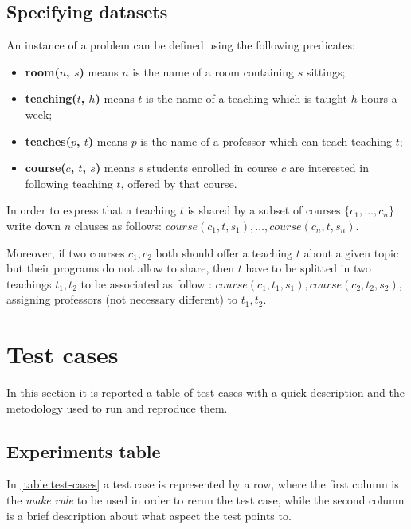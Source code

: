 \documentclass[10pt,a4paper]{article} %
\begin{document}
    \subsection{Specifying datasets}
    An instance of a problem can be defined using the following predicates:
    \begin{itemize}
        \item \textbf{room($n$, $s$)} means $n$ is the name
            of a room containing $s$ sittings;
        \item \textbf{teaching($t$, $h$)} means $t$ is the name
            of a teaching which is taught $h$ hours a week;
        \item \textbf{teaches($p$, $t$)} means $p$ is the name
            of a professor which can teach teaching $t$;
        \item \textbf{course($c$, $t$, $s$)} means $s$ students
            enrolled in course $c$ are interested in following
            teaching $t$, offered by that course.
    \end{itemize}
    In order to express that a teaching $t$ is shared by a subset of
    courses $\lbrace c_1, \ldots, c_n \rbrace$ write down $n$ clauses
    as follows: $ course(c_1, t, s_1), \ldots, course(c_n, t, s_n)$.

    Moreover, if two courses $c_1, c_2$ both should offer a teaching $t$ about
    a given topic but their programs do not allow to share, then $t$
    have to be splitted in two teachings $t_1, t_2$ to be associated as follow :
    $course(c_1, t_1, s_1), course(c_2, t_2, s_2)$,
    assigning professors (not necessary different) to $t_1, t_2$.

    \section{Test cases}
    In this section it is reported a table of test cases with a
    quick description and the metodology used to run and reproduce them.


    \subsection{Experiments table}
    In \ref{table:test-cases} a test case is represented by a row, where
    the first column is the \emph{make rule} to be used in order to rerun the
    test case, while the second column is a brief description about what
    aspect the test points to.
\end{document}
